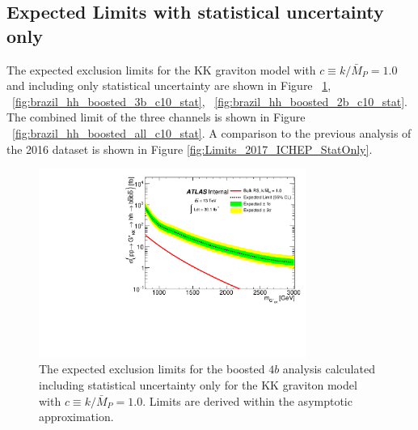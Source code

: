 \pagebreak{}
\subsection{Expected Limits with statistical uncertainty only}
\label{sec:expectedlimits_stat}

The expected exclusion limits for the KK graviton model with  $c \equiv k/\bar{M}_P = 1.0$
and including only statistical uncertainty are shown in Figure ~\ref{fig:brazil_hh_boosted_4b_c10_stat}, ~\ref{fig:brazil_hh_boosted_3b_c10_stat}, ~\ref{fig:brazil_hh_boosted_2b_c10_stat}. The combined limit of the three channels is shown in Figure ~\ref{fig:brazil_hh_boosted_all_c10_stat}. A comparison to the previous analysis of the 2016 dataset is shown in Figure \ref{fig:Limits_2017_ICHEP_StatOnly}.

\begin{figure}
\begin{center}
\includegraphics[width=0.78\textwidth,angle=-90]{figures/boosted/Limit_Stat/BrazilPlot_Asymptotic_RSGC10_merged_2b.pdf}
\caption{The expected exclusion limits for the boosted $4b$ analysis calculated including statistical uncertainty only
for the KK graviton model with $c \equiv k/\bar{M}_P = 1.0$. Limits are derived within the asymptotic approximation.}
\label{fig:brazil_hh_boosted_4b_c10_stat}
\end{center}
\end{figure}

